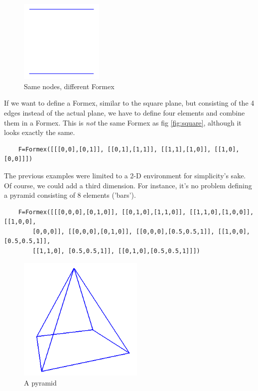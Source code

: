 {\begin{figure}[h]
  \centering
  \begin{makeimage}
  \end{makeimage}
  \begin{latexonly}
    \includegraphics[width=4cm]{images/parallel}
  \end{latexonly}
  \begin{htmlonly}
  \end{htmlonly}  
  \caption{Same nodes, different Formex}
\end{figure}

If we want to define a Formex, similar to the square plane, but consisting of the 4 edges instead of the actual plane, we have to define four elements and combine them in a Formex. This is \emph{not} the same Formex as fig \ref{fig:square}, although it looks exactly the same.
\begin{verbatim}
	F=Formex([[[0,0],[0,1]], [[0,1],[1,1]], [[1,1],[1,0]], [[1,0],[0,0]]])
\end{verbatim}

The previous examples were limited to a 2-D environment for simplicity's sake. Of course, we could add a third dimension. For instance, it's no problem defining a pyramid consisting of 8 elements ('bars').
\begin{verbatim}
	F=Formex([[[0,0,0],[0,1,0]], [[0,1,0],[1,1,0]], [[1,1,0],[1,0,0]], [[1,0,0], 
		[0,0,0]], [[0,0,0],[0,1,0]], [[0,0,0],[0.5,0.5,1]], [[1,0,0],[0.5,0.5,1]], 
		[[1,1,0], [0.5,0.5,1]], [[0,1,0],[0.5,0.5,1]]])
\end{verbatim}

\begin{figure}[h]
  \centering
  \begin{makeimage}
  \end{makeimage}
  \begin{latexonly}
    \includegraphics[width=6cm]{images/pyramide}
  \end{latexonly}
  \begin{htmlonly}
  \end{htmlonly}  
  \caption{A pyramid}
  \label{fig:pyramid}
\end{figure}

}
